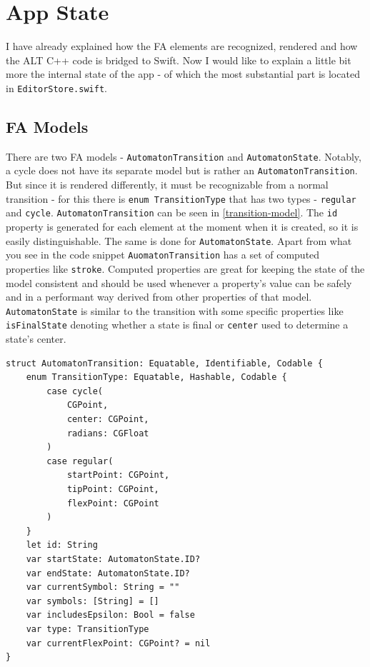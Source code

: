\section{App State}

I have already explained how the FA elements are recognized, rendered and how the ALT C++ code is bridged to Swift. Now I would like to explain a little bit more the internal state of the app - of which the most substantial part is located in \lstinline{EditorStore.swift}.

\subsection{FA Models}

There are two FA models - \lstinline{AutomatonTransition} and \lstinline{AutomatonState}. Notably, a cycle does not have its separate model but is rather an \lstinline{AutomatonTransition}. But since it is rendered differently, it must be recognizable from a normal transition - for this there is \lstinline{enum TransitionType} that has two types - \lstinline{regular} and \lstinline{cycle}. \lstinline{AutomatonTransition} can be seen in \ref{transition-model}. The \lstinline{id} property is generated for each element at the moment when it is created, so it is easily distinguishable. The same is done for \lstinline{AutomatonState}.  Apart from what you see in the code snippet \lstinline{AuomatonTransition} has a set of computed properties like \lstinline{stroke}. Computed properties are great for keeping the state of the model consistent and should be used whenever a property's value can be safely and in a performant way derived from other properties of that model. \lstinline{AutomatonState} is similar to the transition with some specific properties like \lstinline{isFinalState} denoting whether a state is final or \lstinline{center} used to determine a state's center.

\begin{lstlisting}[caption={Transition model}, label=transition-model]
struct AutomatonTransition: Equatable, Identifiable, Codable {
    enum TransitionType: Equatable, Hashable, Codable {
        case cycle(
            CGPoint, 
            center: CGPoint, 
            radians: CGFloat
        )
        case regular(
            startPoint: CGPoint, 
            tipPoint: CGPoint, 
            flexPoint: CGPoint
        )
    }
    let id: String
    var startState: AutomatonState.ID?
    var endState: AutomatonState.ID?
    var currentSymbol: String = ""
    var symbols: [String] = []
    var includesEpsilon: Bool = false
    var type: TransitionType
    var currentFlexPoint: CGPoint? = nil
}
\end{lstlisting}

